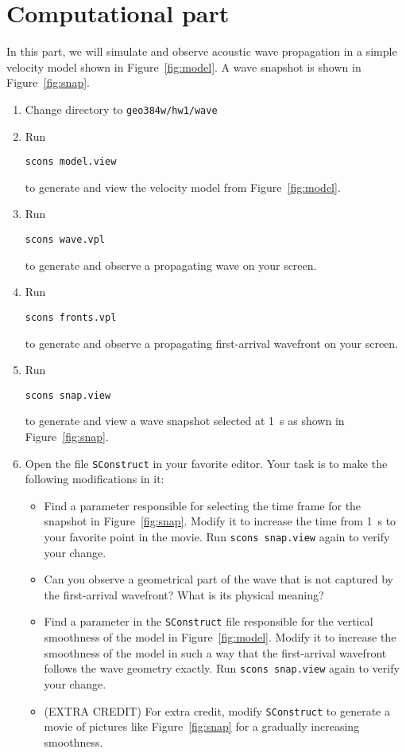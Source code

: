\section{Computational part}

In this part, we will simulate and observe acoustic wave propagation
in a simple velocity model shown in Figure~\ref{fig:model}. A wave snapshot is shown in Figure~\ref{fig:snap}.


\begin{enumerate}
\item Change directory to \verb#geo384w/hw1/wave#
\item Run
\begin{verbatim}
scons model.view
\end{verbatim}
to generate and view the velocity model from Figure~\ref{fig:model}.
\item Run
\begin{verbatim}
scons wave.vpl
\end{verbatim}
to generate and observe a propagating wave on your screen.
\item Run
\begin{verbatim}
scons fronts.vpl
\end{verbatim}
to generate and observe a propagating first-arrival wavefront on your screen.
\item Run
\begin{verbatim}
scons snap.view
\end{verbatim}
to generate and view a wave snapshot selected at 1~s as shown in Figure~\ref{fig:snap}.
\item Open the file \texttt{SConstruct} in your favorite editor. Your task is to make the following modifications in it:
\begin{itemize}
\item Find a parameter responsible for selecting the time frame for the snapshot in Figure~\ref{fig:snap}. 
Modify it to increase the time from 1~s to your favorite point in the movie. Run \texttt{scons snap.view} again to verify your change.
\item Can you observe a geometrical part of the wave that is not captured by the first-arrival wavefront? What is its physical meaning?
\item Find a parameter in the \texttt{SConstruct} file 
responsible for the vertical smoothness of the model in Figure~\ref{fig:model}. Modify it to increase the smoothness of the model in such a way 
that the first-arrival wavefront follows the wave geometry exactly. Run \texttt{scons snap.view} again to verify your change.
\item (EXTRA CREDIT) For extra credit, modify  \texttt{SConstruct} to generate a movie of pictures like Figure~\ref{fig:snap} for a gradually increasing smoothness.
\end{itemize}
\end{enumerate}

